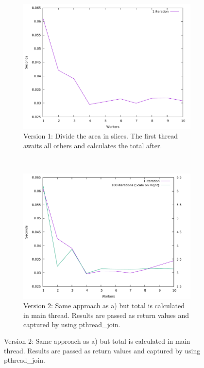 \documentclass[journal]{IEEEtran}
\begin{document}
\begin{figure}[h]
	\centering
	\begin{subfigure}{0.48\textwidth}
		\includegraphics[width=\textwidth]{../results/v1}
		\caption{Version 1: Divide the area in slices. The first thread awaits all others and calculates the total after.}
		\label{fig:v1}
	\end{subfigure}
	~
	\begin{subfigure}{0.48\textwidth}
		\includegraphics[width=\textwidth]{../results/v2}
		\caption{Version 2: Same approach as a) but total is calculated in main thread. Results are passed as return values and captured by using pthread\_join.}
		\label{fig:v2}
	\end{subfigure}

\end{figure}
\end{document}
